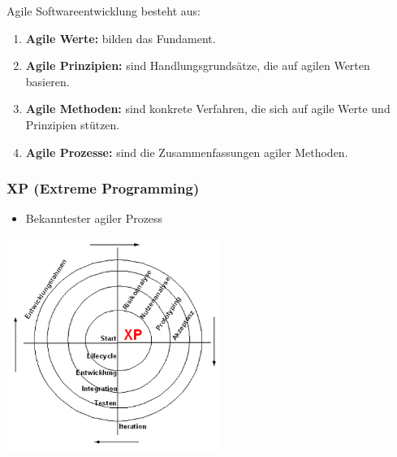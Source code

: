 Agile Softwareentwicklung besteht aus:
\begin{enumerate}
	\item \textbf{Agile Werte:} bilden das Fundament.
	\item \textbf{Agile Prinzipien:} sind Handlungsgrundsätze, die auf agilen Werten basieren.
	\item \textbf{Agile Methoden:} sind konkrete Verfahren, die sich auf agile Werte und Prinzipien stützen.
	\item \textbf{Agile Prozesse:} sind die Zusammenfassungen agiler Methoden.
	\\ 
\end{enumerate}

\begin{multicols}{2}
\subsubsection{XP (Extreme Programming)}
\begin{minipage}{10cm}
	\begin{itemize}
		\item Bekanntester agiler Prozess
	\end{itemize}
\end{minipage}
\begin{minipage}{5cm}
	\includegraphics[width=7cm]{images/extreme_programming.png}
\end{minipage}


\end{multicols}
